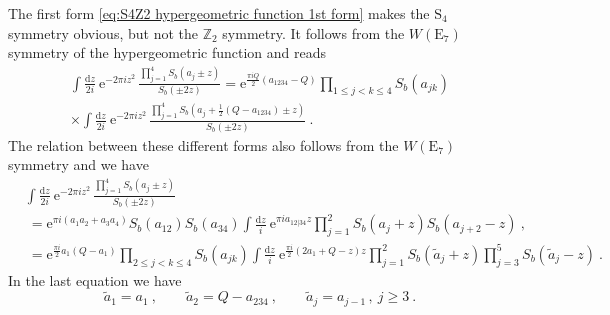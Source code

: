 \documentclass[12pt,a4paper]{article}
\newcommand{\be}{\begin{equation}}
\newcommand{\ee}{\end{equation}}
\renewcommand\d{\text{d}}
\newcommand\ZZ{\mathbb{Z}}
\begin{document}
The first form \eqref{eq:S4Z2 hypergeometric function 1st form} makes the $\mathrm{S}_4$ symmetry obvious, but not the $\ZZ_2$ symmetry. It follows from the $W(\mathrm{E}_7)$ symmetry of the hypergeometric function and reads
\begin{multline} 
    \int \frac{\d z}{2i} \ \mathrm{e}^{-2\pi i z^2}\,  \frac{\prod_{j=1}^4 S_b(a_j \pm z)}{S_b(\pm 2z)} 
    =\mathrm{e}^{\frac{\pi iQ}{2}(a_{1234}-Q)} \prod_{1 \le j<k \le 4} S_b(a_{jk}) \\
    \times \int \frac{\d z}{2i} \ \mathrm{e}^{-2\pi i z^2}\,  \frac{\prod_{j=1}^4 S_b(a_j+\frac{1}{2}(Q-a_{1234}) \pm z)}{S_b(\pm 2z)} \label{eq:S4Z2 hypergeometric function Z2 symmetry}\ .
\end{multline}
The relation between these different forms also follows from the $W(\mathrm{E}_7)$ symmetry and we have
\begin{subequations}
\begin{align}
     &\int \frac{\d z}{2i} \ \mathrm{e}^{-2\pi i z^2}\,  \frac{\prod_{j=1}^4 S_b(a_j \pm z)}{S_b(\pm 2z)} \nonumber \\
     &\ =\mathrm{e}^{\pi i(a_1a_2+a_3a_4)} S_b(a_{12})S_b(a_{34}) \int  \frac{\d z}{i}\ \mathrm{e}^{\pi i a_{12|34}z} \prod_{j=1}^2 S_b(a_j+z) S_b(a_{j+2}-z)\ , \label{eq:S4Z2 hypergeometric function relation first form second form} \\
     &\ =\mathrm{e}^{\frac{\pi i}{2} a_1(Q-a_1)}\!\!\!\! \prod_{2 \le j<k \le 4}\!\!\!\! \!S_b(a_{jk}) \int \frac{\d z}{i} \ \mathrm{e}^{\frac{\pi i}{2}(2a_1+Q-z)z}\prod_{j=1}^2 S_b(\tilde{a}_j+z)\prod_{j=3}^5 S_b(\tilde{a}_j-z)\ . \label{eq:S4Z2 hypergeometric function relation first form third form}%
\end{align}
\end{subequations}
In the last equation we have
\be 
\tilde{a}_1=a_1\ , \qquad \tilde{a}_2=Q-a_{234}\ , \qquad \tilde{a}_j=a_{j-1}\,, \ j \ge 3\ .
\ee









\end{document}
